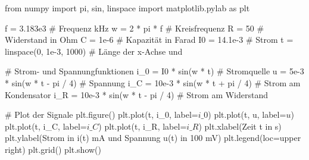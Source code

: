 \documentclass[
  ngerman,
  letterpaper,
]{scrbook}
\newenvironment{Shaded}{}{}
\newcommand{\CommentTok}[1]{\textcolor[rgb]{0.42,0.45,0.49}{#1}}
\newcommand{\DecValTok}[1]{\textcolor[rgb]{0.00,0.36,0.77}{#1}}
\newcommand{\FloatTok}[1]{\textcolor[rgb]{0.00,0.36,0.77}{#1}}
\newcommand{\ImportTok}[1]{\textcolor[rgb]{0.01,0.18,0.38}{#1}}
\newcommand{\NormalTok}[1]{\textcolor[rgb]{0.14,0.16,0.18}{#1}}
\newcommand{\OperatorTok}[1]{\textcolor[rgb]{0.14,0.16,0.18}{#1}}
\newcommand{\StringTok}[1]{\textcolor[rgb]{0.01,0.18,0.38}{#1}}
\begin{document}
\begin{Shaded}
\begin{Highlighting}[]
\ImportTok{from}\NormalTok{ numpy }\ImportTok{import}\NormalTok{ pi, sin, linspace}
\ImportTok{import}\NormalTok{ matplotlib.pylab }\ImportTok{as}\NormalTok{ plt}

\NormalTok{f }\OperatorTok{=} \FloatTok{3.183e3}  \CommentTok{\# Frequenz kHz}
\NormalTok{w }\OperatorTok{=} \DecValTok{2} \OperatorTok{*}\NormalTok{ pi }\OperatorTok{*}\NormalTok{ f  }\CommentTok{\# Kreisfrequenz}
\NormalTok{R }\OperatorTok{=} \DecValTok{50}  \CommentTok{\# Widerstand in Ohm}
\NormalTok{C }\OperatorTok{=} \FloatTok{1e{-}6}  \CommentTok{\# Kapazität in Farad}
\NormalTok{I0 }\OperatorTok{=} \FloatTok{14.1e{-}3}  \CommentTok{\# Strom}
\NormalTok{t }\OperatorTok{=}\NormalTok{ linspace(}\DecValTok{0}\NormalTok{, }\FloatTok{1e{-}3}\NormalTok{, }\DecValTok{1000}\NormalTok{)  }\CommentTok{\# Länge der x{-}Achse und}

\CommentTok{\# Strom{-} und Spannungfunktionen}
\NormalTok{i\_0 }\OperatorTok{=}\NormalTok{ I0 }\OperatorTok{*}\NormalTok{ sin(w }\OperatorTok{*}\NormalTok{ t)  }\CommentTok{\# Stromquelle}
\NormalTok{u }\OperatorTok{=} \FloatTok{5e{-}3} \OperatorTok{*}\NormalTok{ sin(w }\OperatorTok{*}\NormalTok{ t }\OperatorTok{{-}}\NormalTok{ pi }\OperatorTok{/} \DecValTok{4}\NormalTok{)  }\CommentTok{\# Spannung}
\NormalTok{i\_C }\OperatorTok{=} \FloatTok{10e{-}3} \OperatorTok{*}\NormalTok{ sin(w }\OperatorTok{*}\NormalTok{ t }\OperatorTok{+}\NormalTok{ pi }\OperatorTok{/} \DecValTok{4}\NormalTok{)  }\CommentTok{\# Strom am Kondensator}
\NormalTok{i\_R }\OperatorTok{=} \FloatTok{10e{-}3} \OperatorTok{*}\NormalTok{ sin(w }\OperatorTok{*}\NormalTok{ t }\OperatorTok{{-}}\NormalTok{ pi }\OperatorTok{/} \DecValTok{4}\NormalTok{)  }\CommentTok{\# Strom am Widerstand}

\CommentTok{\# Plot der Signale}
\NormalTok{plt.figure()}
\NormalTok{plt.plot(t, i\_0, label}\OperatorTok{=}\StringTok{\textquotesingle{}$i\_0$\textquotesingle{}}\NormalTok{)}
\NormalTok{plt.plot(t, u, label}\OperatorTok{=}\StringTok{\textquotesingle{}$u$\textquotesingle{}}\NormalTok{)}
\NormalTok{plt.plot(t, i\_C, label}\OperatorTok{=}\StringTok{\textquotesingle{}$i\_C$\textquotesingle{}}\NormalTok{)}
\NormalTok{plt.plot(t, i\_R, label}\OperatorTok{=}\StringTok{\textquotesingle{}$i\_R$\textquotesingle{}}\NormalTok{)}
\NormalTok{plt.xlabel(}\StringTok{\textquotesingle{}Zeit t in s\textquotesingle{}}\NormalTok{)}
\NormalTok{plt.ylabel(}\StringTok{\textquotesingle{}Strom in i(t) mA und Spannung u(t) in 100 mV\textquotesingle{}}\NormalTok{)}
\NormalTok{plt.legend(loc}\OperatorTok{=}\StringTok{\textquotesingle{}upper right\textquotesingle{}}\NormalTok{)}
\NormalTok{plt.grid()}
\NormalTok{plt.show()}
\end{Highlighting}
\end{Shaded}
\end{document}
